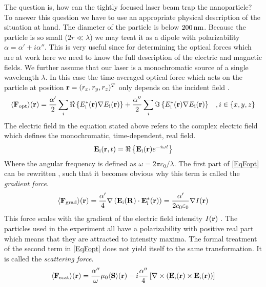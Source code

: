 The question is, how can the tightly focused laser beam trap the nanoparticle? To answer this question we have to use an appropriate physical description of the situation at hand. The diameter of the particle is below $200\nm$. Because the particle is so small ($2r\ll \lambda$) we may treat it as a dipole with polarizability $\alpha=\alpha'+i\alpha''$. This is very useful since for determining the optical forces which are at work here we need to know the full description of the electric and magnetic fields. We further assume that our laser is a monochromatic source of a single wavelength $\lambda$. In this case the time-averaged optical force which acts on the particle at position $\vc{r}=(r_x, r_y, r_z)^T$ only depends on the incident field \cite[p.~457]{novotny2012principles}.
\begin{equation}
	\av{\field{F}{opt}}(\vc{r})=\frac{\alpha'}{2}\sum\limits_{i}\Re\left\{\de{E}{i}^*(\vc{r})\nabla\de{E}{i}(\vc{r})\right\}+\frac{\alpha''}{2}\sum\limits_{i}\Im\left\{\de{E}{i}^*(\vc{r})\nabla\de{E}{i}(\vc{r})\right\}\;\;\;, i\in\{x,y,z\}
\end{equation}
The electric field in the equation stated above refers to the complex electric field which defines the monochromatic, time-dependent, real field.
\begin{equation}\label{EqFopt}
	\field{E}{i}(\vc{r},t)=\Re\left\{\field{E}{i}(\vc{r})e^{-i\omega t}\right\}
\end{equation}
Where the angular frequency is defined as $\omega=2\pi c_0/\lambda$. The first part of \autoref{EqFopt} can be rewritten \cite[p.~457]{novotny2012principles}, such that it becomes obvious why this term is called the \textit{gradient force}.
\begin{equation}
	\av{\field{F}{grad}}(\vc{r})=\frac{\alpha'}{4}\nabla\left(\field{E}{i}(\vc{R})\cdot\field{E}{i}^*(\vc{r})\right)=\frac{\alpha'}{2c_0\varepsilon_0}\nabla I(\vc{r})
\end{equation} 
This force scales with the gradient of the electric field intensity $I(\vc{r})$ \cite[p.~17]{hebestreit2017thermal}. The particles used in the experiment all have a polarizability with positive real part which means that they are attracted to intensity maxima. The formal treatment of the second term in \autoref{EqFopt} does not yield itself to the same transformation. It is called the \textit{scattering force}.
\begin{equation}\label{EqScatteringForce}
	\av{\field{F}{scat}}(\vc{r})=\frac{\alpha''}\omega\mu_0\av{\vc{S}}(\vc{r})-i\frac{\alpha''}{4}\left[\nabla\times\left(\field{E}{i}(\vc{r})\times\field{E}{i}(\vc{r})\right)\right]
\end{equation}
